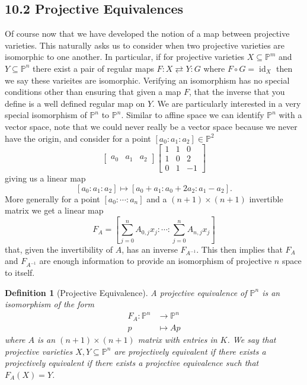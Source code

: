 \documentclass[40pt]{article}
\newtheorem{definition}{Definition}[section]
\newcommand{\Proj}{\mathbb{P}}
\DeclareMathOperator{\id}{\text{id}}
\theoremstyle{remark}
\begin{document}
		\subsection{10.2 Projective Equivalences}
		Of course now that we have developed the notion of a map between projective varieties. This naturally asks us to consider when two projective varieties are isomorphic to one another. In particular, if for projective varieties $X \subseteq \Proj^m$ and $Y \subseteq \Proj^n$ there exist a pair of regular maps $F: X \rightleftarrows Y : G$ where $F \circ G = \id_X$ then we say these varieites are isomorphic. Verifying an isomorphism has no special conditions other than ensuring that given a map $F$, that the inverse that you define is a well defined regular map on $Y$. We are particularly interested in a very special isomorphism of $\Proj^n$ to $\Proj^n$. Similar to affine space we can identify $\Proj^n$ with a vector space, note that we could never really be a vector space because we never have the origin, and consider for a point $[a_0:a_1:a_2] \in \Proj^2$ 
		\[
		\begin{bmatrix}
			a_0 & a_1 & a_2
		\end{bmatrix}\begin{bmatrix}
		1 & 1 & 0 \\
		1 & 0 & 2 \\
		0 & 1 & -1 
		\end{bmatrix}
		\]
		giving us a linear map 
		\[
		[a_0 : a_1 : a_2 ] \mapsto [a_0 + a_1 : a_0 + 2a_2 : a_1 - a_2]. 
		\]
		More generally for a point $[a_0:\cdots:a_n]$ and a $(n+1) \times (n+1)$ invertible matrix we get a linear map 
		\[
		F_A = \left [ \sum_{j=0}^n A_{0,j}x_j : \cdots : \sum_{j=0}^n A_{n,j}x_j \right]
		\]
		that, given the invertibility of $A$, has an inverse $F_{A^{-1}}$. This then implies that $F_A$ and $F_{A^{-1}}$ are enough information to provide an isomorphism of projective $n$ space to itself. 
		\begin{definition}[Projective Equivalence]
			A projective equivalence of $\Proj^n$ is an isomorphism of the form 
			\begin{align}
				F_A: \Proj^n &\rightarrow \Proj^n \\
				p &\mapsto Ap
			\end{align}
			where $A$ is an $(n + 1 ) \times (n+1)$ matrix with entries in $K$. We say that projective varieties $X,Y \subseteq \Proj^n$ are projectively equivalent if there exists a projectively equivalent if there exists a projective equivalence such that $F_A(X) = Y$. 
		\end{definition}
\end{document}
